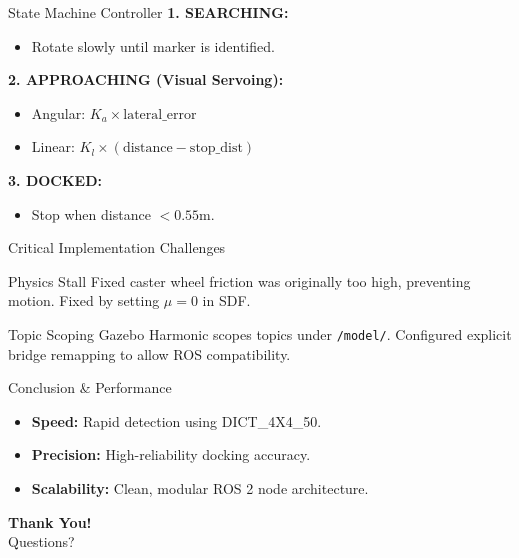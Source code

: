 \documentclass{beamer}
\begin{document}
\begin{frame}{State Machine Controller}
    \textbf{1. SEARCHING:}
    \begin{itemize}
        \item Rotate slowly until marker is identified.
    \end{itemize}
    \textbf{2. APPROACHING (Visual Servoing):}
    \begin{itemize}
        \item Angular: $K_a \times \text{lateral\_error}$
        \item Linear: $K_l \times (\text{distance} - \text{stop\_dist})$
    \end{itemize}
    \textbf{3. DOCKED:}
    \begin{itemize}
        \item Stop when distance $< 0.55\text{m}$.
    \end{itemize}
\end{frame}

\begin{frame}{Critical Implementation Challenges}
    \begin{alertblock}{Physics Stall}
        Fixed caster wheel friction was originally too high, preventing motion. Fixed by setting $\mu=0$ in SDF.
    \end{alertblock}
    \begin{block}{Topic Scoping}
        Gazebo Harmonic scopes topics under \texttt{/model/}. Configured explicit bridge remapping to allow ROS compatibility.
    \end{block}
\end{frame}

\begin{frame}{Conclusion \& Performance}
    \begin{itemize}
        \item \textbf{Speed:} Rapid detection using DICT\_4X4\_50.
        \item \textbf{Precision:} High-reliability docking accuracy.
        \item \textbf{Scalability:} Clean, modular ROS 2 node architecture.
    \end{itemize}
    \begin{center}
        \textbf{Thank You!} \\
        Questions?
    \end{center}
\end{frame}
\end{document}
